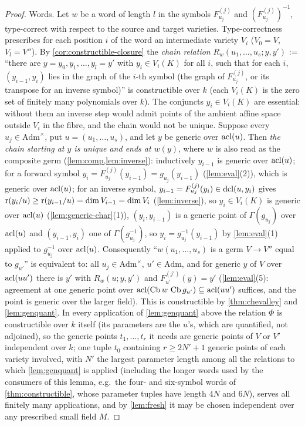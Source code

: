 \begin{proof}
Words.  Let $w$ be a word of length $l$ in the symbols $F^{(j)}_{u_j}$ and
$(F^{(j)}_{u_j})^{-1}$, type-correct with respect to the source and target varieties.
Type-correctness prescribes for each position $i$ of the word an intermediate
variety $V_i$ ($V_0=V$, $V_l=V''$).  By \cref{cor:constructible-closure} the \emph{chain
relation} $R_w(u_1,\dots,u_s;y,y')$ := ``there are $y=y_0,y_1,\dots,y_l=y'$ with
$y_i\in V_i(K)$ for all $i$, such that for each $i$, $(y_{i-1},y_i)$ lies in the graph of
the $i$-th symbol (the graph of $F^{(j)}_{u_j}$, or its transpose for an inverse symbol)''
is constructible over $k$ (each $V_i(K)$ is the zero set of finitely many polynomials
over $k$).  The conjuncts $y_i\in V_i(K)$ are essential: without them an inverse step
would admit points of the ambient affine space outside $V_i$ in the fibre, and the chain
would not be unique.  Suppose every $u_j\in\mathrm{Adm}^\times$, put $u=(u_1,\dots,u_s)$,
and let $y$ be generic over $\operatorname{acl}(u)$.
Then \emph{the chain starting at $y$ is unique and ends at $w(y)$}, where $w$ is also read
as the composite germ (\cref{lem:comp,lem:inverse}): inductively $y_{i-1}$ is generic
over $\operatorname{acl}(u)$; for a forward symbol $y_i=F^{(j)}_{u_j}(y_{i-1})=g_{u_j}(y_{i-1})$
(\cref{lem:eval}(2)), which is generic over $\operatorname{acl}(u)$; for an inverse symbol,
$y_{i-1}=F^{(j)}_{u_j}(y_i)\in\operatorname{dcl}(u,y_i)$ gives $\operatorname{r}(y_i/u)\ge\operatorname{r}(y_{i-1}/u)=\dim V_{i-1}
=\dim V_i$ (\cref{lem:inverse}), so $y_i\in V_i(K)$ is generic over $\operatorname{acl}(u)$
(\cref{lem:generic-char}(1)), $(y_i,y_{i-1})$ is a generic point of
$\Gamma(g_{u_j})$ over $\operatorname{acl}(u)$ and $(y_{i-1},y_i)$ one of $\Gamma(g_{u_j}^{-1})$, so
$y_i=g_{u_j}^{-1}(y_{i-1})$ by \cref{lem:eval}(1) applied to $g_{u_j}^{-1}$ over $\operatorname{acl}(u)$.
Consequently ``$w(u_1,\dots,u_s)$ is a germ $V\to V''$ equal to $g_{u'}$'' is equivalent
to: all $u_j\in\mathrm{Adm}^\times$, $u'\in\mathrm{Adm}$, and for generic $y$ of $V$ over
$\operatorname{acl}(uu')$ there is $y'$ with $R_w(u;y,y')$ and $F^{(j')}_{u'}(y)=y'$ (\cref{lem:eval}(5):
agreement at one generic point over $\operatorname{acl}(\operatorname{Cb} w\,\operatorname{Cb} g_{u'})\subseteq\operatorname{acl}(uu')$ suffices,
and the point is generic over the larger field).  This is constructible by
\cref{thm:chevalley} and \cref{lem:genquant}.  In every application of \cref{lem:genquant}
above the relation $\Phi$ is constructible over $k$ itself (its parameters are the
$u$'s, which are quantified, not adjoined), so the generic points $t_1,\dots,t_r$ it needs
are generic points of $V$ or $V'$ independent over $k$; one tuple $t_0$ containing
$r\ge2N'+1$ generic points of each variety involved, with $N'$ the largest parameter
length among all the relations to which \cref{lem:genquant} is applied (including the
longer words used by the consumers of this lemma, e.g.\ the four- and six-symbol words
of \cref{thm:constructible}, whose parameter tuples have length $4N$ and $6N$), serves all
finitely many applications, and by \cref{lem:fresh} it may be chosen independent over
any prescribed small field $M$.
\end{proof}

